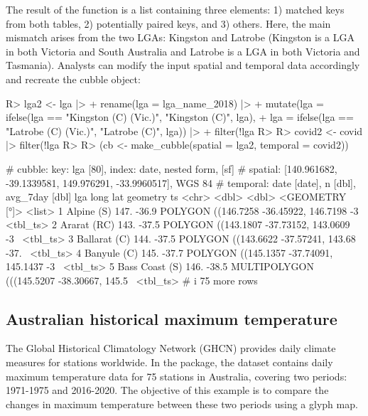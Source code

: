 \documentclass[
  shortnames]{jss}
\begin{document}
The result of the  function is a list containing three elements: 1) matched keys from both tables, 2) potentially paired keys, and 3) others. Here, the main mismatch arises from the two LGAs: Kingston and Latrobe (Kingston is a LGA in both Victoria and South Australia and Latrobe is a LGA in both Victoria and Tasmania). Analysts can modify the input spatial and temporal data accordingly and recreate the cubble object:

\begin{CodeChunk}
\begin{CodeInput}
R> lga2 <- lga |>
+   rename(lga = lga_name_2018) |> 
+   mutate(lga = ifelse(lga == "Kingston (C) (Vic.)", "Kingston (C)", lga),
+          lga = ifelse(lga == "Latrobe (C) (Vic.)", "Latrobe (C)", lga)) |>
+   filter(!lga %
R>   
R> covid2 <- covid |> filter(!lga %
R> 
R> (cb <- make_cubble(spatial = lga2, temporal = covid2))
\end{CodeInput}
\begin{CodeOutput}
# cubble:   key: lga [80], index: date, nested form, [sf]
# spatial:  [140.961682, -39.1339581, 149.976291, -33.9960517], WGS 84
# temporal: date [date], n [dbl], avg_7day [dbl]
  lga             long   lat                                   geometry ts      
  <chr>          <dbl> <dbl>                             <GEOMETRY [°]> <list>  
1 Alpine (S)      147. -36.9 POLYGON ((146.7258 -36.45922, 146.7198 -3~ <tbl_ts>
2 Ararat (RC)     143. -37.5 POLYGON ((143.1807 -37.73152, 143.0609 -3~ <tbl_ts>
3 Ballarat (C)    144. -37.5 POLYGON ((143.6622 -37.57241, 143.68 -37.~ <tbl_ts>
4 Banyule (C)     145. -37.7 POLYGON ((145.1357 -37.74091, 145.1437 -3~ <tbl_ts>
5 Bass Coast (S)  146. -38.5 MULTIPOLYGON (((145.5207 -38.30667, 145.5~ <tbl_ts>
# i 75 more rows
\end{CodeOutput}
\end{CodeChunk}

\hypertarget{historicaltmax}{%
\subsection{Australian historical maximum temperature}\label{historicaltmax}}

The Global Historical Climatology Network (GHCN) provides daily climate measures for stations worldwide. In the  package, the dataset  contains daily maximum temperature data for 75 stations in Australia, covering two periods: 1971-1975 and 2016-2020. The objective of this example is to compare the changes in maximum temperature between these two periods using a glyph map.
\end{document}
